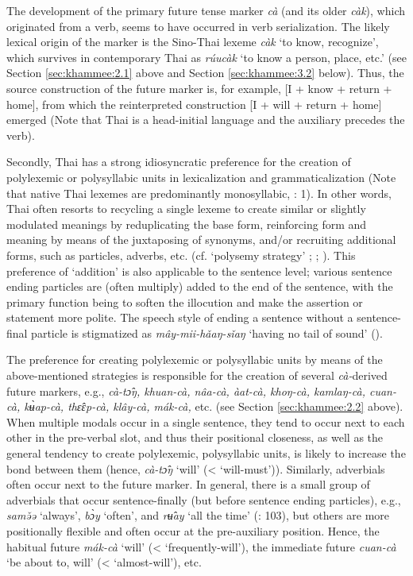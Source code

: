 \documentclass[output=paper,colorlinks,citecolor=brown]{langscibook}
\begin{document}
The development of the primary future tense marker \textit{cà} (and its older \textit{càk}), which originated from a verb, seems to have occurred in verb serialization. The likely lexical origin of the marker is the Sino-Thai lexeme \textit{càk} ‘to know, recognize’, which survives in contemporary Thai as \textit{rúucàk} ‘to know a person, place, etc.’ (see Section \ref{sec:khammee:2.1} above and Section \ref{sec:khammee:3.2} below). Thus, the source construction of the future marker is, for example, [I + know + return + home], from which the reinterpreted construction [I + will + return + home] emerged (Note that Thai is a head-initial language and the auxiliary precedes the verb).

Secondly, Thai has a strong idiosyncratic preference for the creation of polylexemic or polysyllabic units in lexicalization and grammaticalization (Note that native Thai lexemes are predominantly monosyllabic, \cite{Smyth2002}: 1). In other words, Thai often resorts to recycling a single lexeme to create similar or slightly modulated meanings by reduplicating the base form, reinforcing form and meaning by means of the juxtaposing of synonyms, and/or recruiting additional forms, such as particles, adverbs, etc. (cf. ‘polysemy strategy’ \cite{KhammeeRhee2022}; \cite{RheeKhammee2022}; \cite{ThirakunkovitRhee2023}). This preference of ‘addition’ is also applicable to the sentence level; various sentence ending particles are (often multiply) added to the end of the sentence, with the primary function being to soften the illocution and make the assertion or statement more polite. The speech style of ending a sentence without a sentence-final particle is stigmatized as \textit{mây-mii-hǎaŋ-sǐaŋ} ‘having no tail of sound’ (\cite{khammee2024demonstratives}). 

The preference for creating polylexemic or polysyllabic units by means of the above-mentioned strategies is responsible for the creation of several \textit{cà-}derived future markers, e.g., \textit{cà-tɔ̂ŋ, khuan-cà, nâa-cà, àat-cà, khoŋ-cà, kamlaŋ-cà, cuan-cà, kʉ̀ap-cà, thɛ̂ɛp-cà, klây-cà, mák-cà,} etc. (see Section \ref{sec:khammee:2.2} above). When multiple modals occur in a single sentence, they tend to occur next to each other in the pre-verbal slot, and thus their positional closeness, as well as the general tendency to create polylexemic, polysyllabic units, is likely to increase the bond between them (hence, \textit{cà-tɔ̂ŋ} ‘will’ (< ‘will-must’)). Similarly, adverbials often occur next to the future marker. In general, there is a small group of adverbials that occur sentence-finally (but before sentence ending particles), e.g., \textit{samə̌ə} ‘always’, \textit{bɔ̀y} ‘often’, and \textit{rʉ̂ay} ‘all the time’ (\cite{IwasakiIngkaphirom2005}: 103), but others are more positionally flexible and often occur at the pre-auxiliary position. Hence, the habitual future \textit{mák-cà} ‘will’ (< ‘frequently-will’), the immediate future \textit{cuan-cà} ‘be about to, will’ (< ‘almost-will’), etc.
\end{document}
